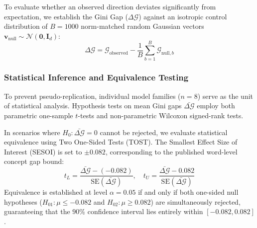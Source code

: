 To evaluate whether an observed direction deviates significantly from expectation, we establish the Gini Gap ($\Delta \mathcal{G}$) against an isotropic control distribution of $B = 1000$ norm-matched random Gaussian vectors $\mathbf{v}_{\text{null}} \sim \mathcal{N}(\mathbf{0}, \mathbf{I}_d)$:
\begin{equation}
\Delta \mathcal{G} = \mathcal{G}_{\text{observed}} - \frac{1}{B} \sum_{b=1}^{B} \mathcal{G}_{\text{null}, b}
\end{equation}

\subsubsection{Statistical Inference and Equivalence Testing}
To prevent pseudo-replication, individual model families ($n=8$) serve as the unit of statistical analysis. Hypothesis tests on mean Gini gaps $\bar{\Delta \mathcal{G}}$ employ both parametric one-sample $t$-tests and non-parametric Wilcoxon signed-rank tests.

In scenarios where $H_0: \bar{\Delta \mathcal{G}} = 0$ cannot be rejected, we evaluate statistical equivalence using Two One-Sided Tests (TOST). The Smallest Effect Size of Interest (SESOI) is set to $\pm 0.082$, corresponding to the published word-level concept gap bound:
\begin{equation}
t_L = \frac{\bar{\Delta \mathcal{G}} - (-0.082)}{\text{SE}(\bar{\Delta \mathcal{G}})}, \quad t_U = \frac{\bar{\Delta \mathcal{G}} - 0.082}{\text{SE}(\bar{\Delta \mathcal{G}})}
\end{equation}
Equivalence is established at level $\alpha = 0.05$ if and only if both one-sided null hypotheses ($H_{01}: \mu \le -0.082$ and $H_{02}: \mu \ge 0.082$) are simultaneously rejected, guaranteeing that the $90\%$ confidence interval lies entirely within $[-0.082, 0.082]$.

